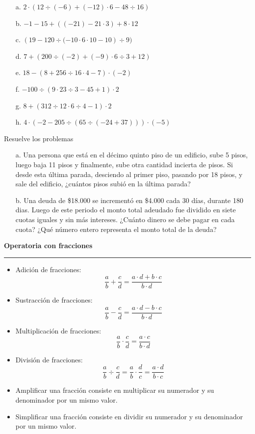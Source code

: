 \documentclass[spanish,letterpaper, 11pt, addpoints, answers]{exam}
\begin{document}
\begin{questions}
  \begin{multicols}{2}
  \begin{itemize}
  \item[a.]$2\cdot \left( 12\div (-6)+(-12)\cdot 6-48\div 16\right)$
  \item[b.]$-1-15+\left((-21)-21\cdot 3\right) +8\cdot 12$
  \item[c.]$\left( 19-120\div (-10\cdot 6\cdot 10-10\right) \div 9)$
  \item[d.]$7+\left( 200\div (-2)+(-9)\cdot 6\div 3+12\right)$
  \item[e.]$18-\left( 8+256\div 16\cdot 4-7\right) \cdot(-2)$
  \item[f.] $-100\div \left( 9\cdot 23\div 3- 45+1\right) \cdot 2$
  \item[g.] $8 + \left( 312\div 12\cdot 6\div  4-1\right) \cdot 2$
  \item[h.] $4\cdot \left( -2-205\div \left(65\div \left(-24+37\right)\right)\right) \cdot (-5)$
  \end{itemize}

\end{multicols}

  \question Resuelve los problemas

  \begin{itemize}
  \item[a. ] Una persona que está en el décimo quinto piso de un edificio, sube 5 pisos, luego baja 11 pisos y finalmente, sube otra cantidad incierta de pisos. Si desde esta última parada, desciendo al primer piso, pasando por 18 pisos, y sale del edificio, ¿cuántos pisos subió en la última parada?
  \item[b. ] Una deuda de \$18.000 se incrementó en \$4.000 cada 30 días, durante 180 dias. Luego de este periodo el monto total adeudado fue dividido en siete cuotas iguales y sin más intereses. ¿Cuánto dinero se debe pagar en cada cuota? ¿Qué número entero representa el monto total de la deuda?
  \end{itemize}
  \newpage

  \parbox{6in}{
    \textbf{Operatoria con fracciones}}
    \vspace{0.15in}
    \hrule
    
    \begin{itemize}
      \item Adición de fracciones: 
      $$\dfrac{a}{b}+\dfrac{c}{d}=\dfrac{a\cdot d+b\cdot c}{b\cdot d}$$
      \item Sustracción de fracciones: 
      $$\dfrac{a}{b}-\dfrac{c}{d}=\dfrac{a\cdot d-b\cdot c}{b\cdot d}$$
      \item Multiplicación de fracciones:
      $$\dfrac{a}{b}\cdot \dfrac{c}{d}=\dfrac{a\cdot c}{b\cdot d}$$
      \item División de fracciones:
      $$\dfrac{a}{b}\div \dfrac{c}{d}=\dfrac{a}{b}\cdot \dfrac{d}{c}=\dfrac{a\cdot d}{b\cdot c}$$
      \item Amplificar una fracción consiste en multiplicar su numerador y su denominador por un mismo valor.
      \item Simplificar una fracción consiste en dividir su numerador y su denominador por un mismo valor.
    \end{itemize}


\end{questions}
\end{document}
